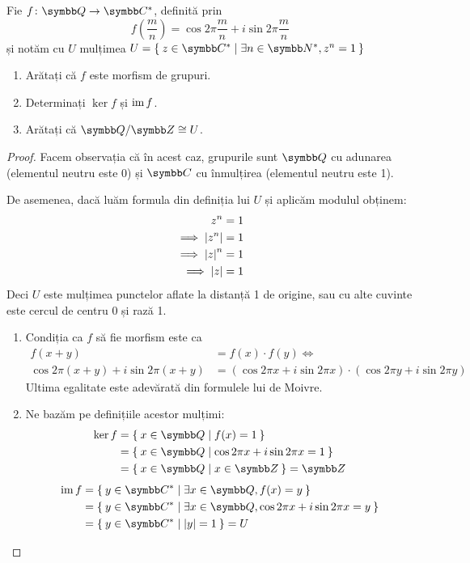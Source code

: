 \begin{exercise}
Fie \(\function{f}{\rationals}{\complex^*}\), definită prin
\[
    f(\frac{m}{n}) = \cos 2\pi \frac{m}{n} + i \sin 2 \pi \frac{m}{n}
\]
și notăm cu \(U\) mulțimea \(U = \Set{ z \in \complex^* | \exists n \in \naturals^*, z^n = 1 }\)

\begin{enumerate}
    \item Arătați că \(f\) este morfism de grupuri.
    \item Determinați \(\ker f\) și \(\operatorname{im} f\).
    \item Arătați că \(\rationals / \integers \cong U\).
\end{enumerate}
\end{exercise}
\begin{proof}
Facem observația că în acest caz, grupurile sunt \(\rationals\) cu adunarea (elementul neutru este 0) și \(\complex\) cu înmulțirea (elementul neutru este 1).

De asemenea, dacă luăm formula din definiția lui \(U\) și aplicăm modulul obținem:
\begin{align*}
    z^n &= 1 \\
    \implies \left\lvert z^n \right\rvert &= 1 \\
    \implies \left\lvert z \right\rvert^n &= 1 \\
    \implies \left\lvert z \right\rvert &= 1
\end{align*}
Deci \(U\) este mulțimea punctelor aflate la distanță 1 de origine, sau cu alte cuvinte este cercul de centru 0 și rază 1.

\begin{enumerate}
    \item Condiția ca \(f\) să fie morfism este ca
    \begin{align*}
        f(x + y) &= f(x) \cdot f(y) \iff \\
        \cos 2 \pi (x + y) + i \sin 2 \pi (x + y) &= (\cos 2 \pi x + i \sin 2 \pi x) \cdot (\cos 2 \pi y + i \sin 2 \pi y)
    \end{align*}
    Ultima egalitate este adevărată din formulele lui de Moivre.
    
    \item Ne bazăm pe definițiile acestor mulțimi:
    \begin{align*}
        \ker f &= \Set{ x \in \rationals | f(x) = 1 } \\
        &= \Set{ x \in \rationals | \cos 2 \pi x + i \sin 2 \pi x = 1 } \\
        &= \Set{ x \in \rationals | x \in \integers } = \integers
    \end{align*}
    \begin{align*}
        \im f &= \Set{ y \in \complex^* | \exists x \in \rationals, f(x) = y } \\
        &= \Set{ y \in \complex^* | \exists x \in \rationals, \cos 2 \pi x + i \sin 2 \pi x = y } \\
        &= \Set{ y \in \complex^* | \abs{y} = 1 } = U
    \end{align*}
    

\end{enumerate}
\end{proof}
